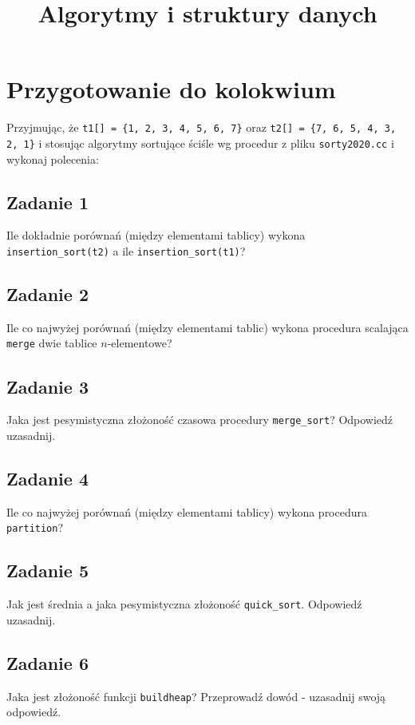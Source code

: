 \documentclass{article}
\begin{document}
\title{Algorytmy i struktury danych}
\author{}
\date{}
\maketitle

\section*{Przygotowanie do kolokwium}
Przyjmując, że \verb+t1[] = {1, 2, 3, 4, 5, 6, 7}+ oraz \verb+t2[] = {7, 6, 5, 4, 3, 2, 1}+ i stosując algorytmy
sortujące ściśle wg procedur z pliku \verb+sorty2020.cc+ i wykonaj polecenia:

\subsection*{Zadanie 1}
Ile dokładnie porównań (między elementami tablicy) wykona \verb+insertion_sort(t2)+ a ile \verb+insertion_sort(t1)+?

\subsection*{Zadanie 2}
Ile co najwyżej porównań (między elementami tablic) wykona procedura scalająca \verb+merge+
dwie tablice $n$-elementowe?

\subsection*{Zadanie 3}
Jaka jest pesymistyczna złożoność czasowa procedury \verb+merge_sort+? Odpowiedź uzasadnij.

\subsection*{Zadanie 4}
Ile co najwyżej porównań (między elementami tablicy) wykona procedura \verb+partition+?

\subsection*{Zadanie 5}
Jak jest średnia a jaka pesymistyczna złożoność \verb+quick_sort+. Odpowiedź uzasadnij.

\subsection*{Zadanie 6}
Jaka jest złożoność funkcji \verb+buildheap+? Przeprowadź dowód - uzasadnij swoją odpowiedź.
\end{document}
